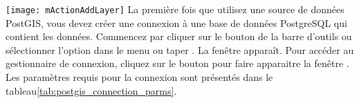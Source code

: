 \texttt{[image: mActionAddLayer]}
La première fois que utilisez une source de données PostGIS, vous devez créer une connexion à une base de données PostgreSQL qui contient les données. Commencez par cliquer sur le bouton  de la barre d'outils ou sélectionner l'option  dans le menu  ou taper .
La fenêtre  apparaît. Pour accéder au gestionnaire de connexion, cliquez sur le bouton  pour faire apparaitre la fenêtre . Les paramètres requis pour la connexion sont présentés dans le tableau\ref{tab:postgis_connection_parms}.

